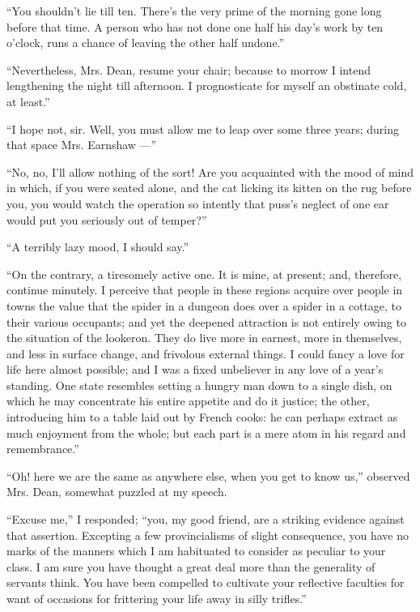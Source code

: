 \par “You shouldn't lie till ten. There's the very prime of the morning gone long before that time. A person who has not done one half his day's work by ten o'clock, runs a chance of leaving the other half undone.”
\par “Nevertheless, Mrs. Dean, resume your chair; because to morrow I intend lengthening the night till afternoon. I prognosticate for myself an obstinate cold, at least.”
\par “I hope not, sir. Well, you must allow me to leap over some three years; during that space Mrs. Earnshaw —”
\par “No, no, I'll allow nothing of the sort! Are you acquainted with the mood of mind in which, if you were seated alone, and the cat licking its kitten on the rug before you, you would watch the operation so intently that puss's neglect of one ear would put you seriously out of temper?”
\par “A terribly lazy mood, I should say.”
\par “On the contrary, a tiresomely active one. It is mine, at present; and, therefore, continue minutely. I perceive that people in these regions acquire over people in towns the value that the spider in a dungeon does over a spider in a cottage, to their various occupants; and yet the deepened attraction is not entirely owing to the situation of the lookeron. They do live more in earnest, more in themselves, and less in surface change, and frivolous external things. I could fancy a love for life here almost possible; and I was a fixed unbeliever in any love of a year's standing. One state resembles setting a hungry man down to a single dish, on which he may concentrate his entire appetite and do it justice; the other, introducing him to a table laid out by French cooks: he can perhaps extract as much enjoyment from the whole; but each part is a mere atom in his regard and remembrance.”
\par “Oh! here we are the same as anywhere else, when you get to know us,” observed Mrs. Dean, somewhat puzzled at my speech.
\par “Excuse me,” I responded; “you, my good friend, are a striking evidence against that assertion. Excepting a few provincialisms of slight consequence, you have no marks of the manners which I am habituated to consider as peculiar to your class. I am sure you have thought a great deal more than the generality of servants think. You have been compelled to cultivate your reflective faculties for want of occasions for frittering your life away in silly trifles.”
